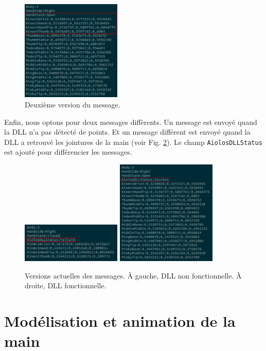 \begin{figure}[H]
  \label{fig:socketv2}
  \begin{center}
    \includegraphics[width=180px]{images/socket_v2.png}
    \caption{Deuxième version du message.}
  \end{center}
\end{figure}

Enfin, nous optons pour deux messages diffèrents. Un message 
est envoyé quand la DLL n'a pas détecté de points. Et un message 
différent est envoyé quand la DLL a retrouvé les jointures de la main (voir Fig. \ref{fig:socketv3}).
Le champ \texttt{AiolosDLLStatus} est ajouté pour différencier les 
messages.

\begin{figure}[H]
  \label{fig:socketv3}
  \begin{center}
    \includegraphics[width=180px]{images/socket_v3-2.png}
    \includegraphics[width=180px]{images/socket_v3-1.png}
    \caption{Versions actuelles des messages. À gauche, DLL non fonctionnelle. À droite, DLL fonctionnelle.}
  \end{center}
\end{figure}

\section{Modélisation et animation de la main}
